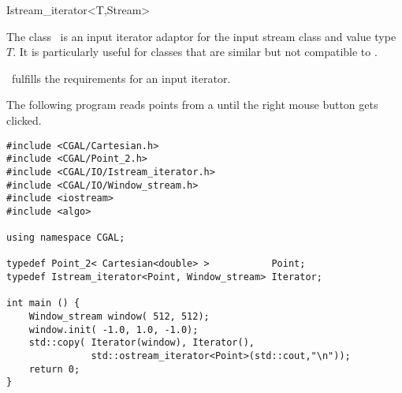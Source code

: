 \begin{ccClassTemplate}{Istream_iterator<T,Stream>}

\ccDefinition

The class \ccClassTemplateName\ is an input iterator adaptor for the
input stream class  and value type $T$. It is particularly
useful for classes that are similar but not compatible to .


\ccCreation
{}



\ccOperations

\ccVar\ fulfills the requirements for an input iterator.

\ccExample

The following program reads points from a  until
the right mouse button gets clicked.

\begin{verbatim}
#include <CGAL/Cartesian.h>
#include <CGAL/Point_2.h>
#include <CGAL/IO/Istream_iterator.h>
#include <CGAL/IO/Window_stream.h>
#include <iostream>
#include <algo>

using namespace CGAL;

typedef Point_2< Cartesian<double> >           Point;
typedef Istream_iterator<Point, Window_stream> Iterator;

int main () {
    Window_stream window( 512, 512);
    window.init( -1.0, 1.0, -1.0);
    std::copy( Iterator(window), Iterator(), 
               std::ostream_iterator<Point>(std::cout,"\n"));
    return 0;
}
\end{verbatim}

\end{ccClassTemplate}

